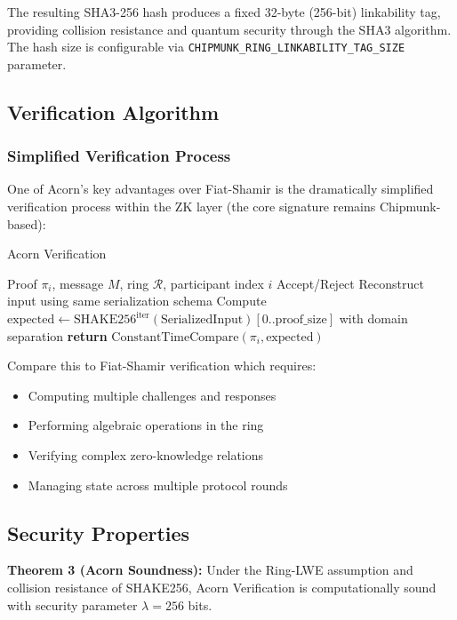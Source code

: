 \documentclass[11pt,a4paper]{article}
\begin{document}
The resulting SHA3-256 hash produces a fixed 32-byte (256-bit) linkability tag, providing collision resistance and quantum security through the SHA3 algorithm. The hash size is configurable via \texttt{CHIPMUNK\_RING\_LINKABILITY\_TAG\_SIZE} parameter.

\subsection{Verification Algorithm}

\subsubsection{Simplified Verification Process}

One of Acorn's key advantages over Fiat-Shamir is the dramatically simplified verification process within the ZK layer (the core signature remains Chipmunk-based):

\begin{algorithm}
\caption{Acorn Verification}
\begin{algorithmic}[1]
\REQUIRE Proof $\pi_i$, message $M$, ring $\mathcal{R}$, participant index $i$
\ENSURE Accept/Reject
\STATE Reconstruct input using same serialization schema
\STATE Compute $\text{expected} \leftarrow \text{SHAKE256}^{\text{iter}}(\text{SerializedInput})[0..\text{proof\_size}]$ with domain separation
\STATE \textbf{return} $\text{ConstantTimeCompare}(\pi_i, \text{expected})$
\end{algorithmic}
\end{algorithm}

Compare this to Fiat-Shamir verification which requires:
\begin{itemize}
\item Computing multiple challenges and responses
\item Performing algebraic operations in the ring
\item Verifying complex zero-knowledge relations
\item Managing state across multiple protocol rounds
\end{itemize}

\subsection{Security Properties}

\textbf{Theorem 3 (Acorn Soundness):} Under the Ring-LWE assumption and collision resistance of SHAKE256, Acorn Verification is computationally sound with security parameter $\lambda = 256$ bits.
\end{document}
